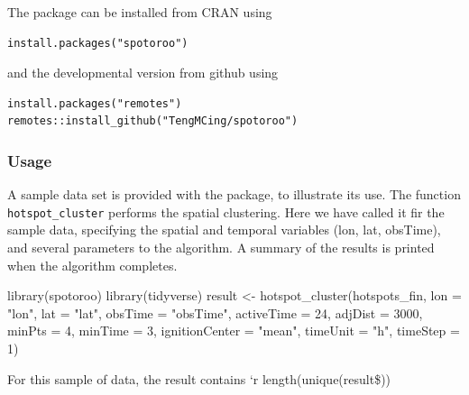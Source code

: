 The package can be installed from CRAN using

\begin{verbatim}
install.packages("spotoroo")
\end{verbatim}

and the developmental version from github using

\begin{verbatim}
install.packages("remotes")
remotes::install_github("TengMCing/spotoroo")
\end{verbatim}

\hypertarget{usage}{%
\subsubsection{Usage}\label{usage}}

A sample data set is provided with the package, to illustrate its use.
The function \texttt{hotspot\_cluster} performs the spatial clustering.
Here we have called it fir the sample data, specifying the spatial and
temporal variables (lon, lat, obsTime), and several parameters to the
algorithm. A summary of the results is printed when the algorithm
completes.

\begin{Schunk}
\begin{Sinput}
library(spotoroo)
library(tidyverse)
result <- hotspot_cluster(hotspots_fin,
                          lon = "lon",
                          lat = "lat",
                          obsTime = "obsTime",
                          activeTime = 24,
                          adjDist = 3000,
                          minPts = 4,
                          minTime = 3,
                          ignitionCenter = "mean",
                          timeUnit = "h",
                          timeStep = 1)
\end{Sinput}
\end{Schunk}

For this sample of data, the result contains `r length(unique(result\$))

